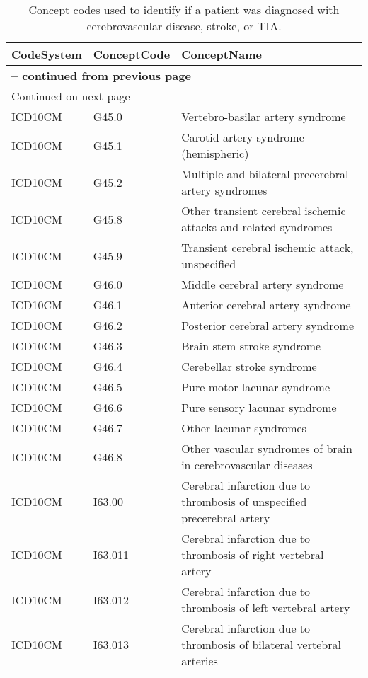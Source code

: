 \begin{longtable}{p{}p{}p{}}
\caption{Concept codes used to identify if a patient was diagnosed with cerebrovascular disease, stroke, or TIA.} \\ 
 CodeSystem & ConceptCode & ConceptName \\ 
  \hline 
\endfirsthead 
\multicolumn{3}{p{\textwidth}}{{ \bfseries \tablename \thetable{} -- continued from previous page}} \ 
\hline CodeSystem & ConceptCode & ConceptName \\ \hline 
\endhead 
\hline \multicolumn{3}{p{\textwidth}}{{Continued on next page}} \\ \hline 
\endfoot 
\hline 
\endlastfoot 
 \hline
ICD10CM & G45.0 & Vertebro-basilar artery syndrome \\ 
  ICD10CM & G45.1 & Carotid artery syndrome (hemispheric) \\ 
  ICD10CM & G45.2 & Multiple and bilateral precerebral artery syndromes \\ 
  ICD10CM & G45.8 & Other transient cerebral ischemic attacks and related syndromes \\ 
  ICD10CM & G45.9 & Transient cerebral ischemic attack, unspecified \\ 
  ICD10CM & G46.0 & Middle cerebral artery syndrome \\ 
  ICD10CM & G46.1 & Anterior cerebral artery syndrome \\ 
  ICD10CM & G46.2 & Posterior cerebral artery syndrome \\ 
  ICD10CM & G46.3 & Brain stem stroke syndrome \\ 
  ICD10CM & G46.4 & Cerebellar stroke syndrome \\ 
  ICD10CM & G46.5 & Pure motor lacunar syndrome \\ 
  ICD10CM & G46.6 & Pure sensory lacunar syndrome \\ 
  ICD10CM & G46.7 & Other lacunar syndromes \\ 
  ICD10CM & G46.8 & Other vascular syndromes of brain in cerebrovascular diseases \\ 
  ICD10CM & I63.00 & Cerebral infarction due to thrombosis of unspecified precerebral artery \\ 
  ICD10CM & I63.011 & Cerebral infarction due to thrombosis of right vertebral artery \\ 
  ICD10CM & I63.012 & Cerebral infarction due to thrombosis of left vertebral artery \\ 
  ICD10CM & I63.013 & Cerebral infarction due to thrombosis of bilateral vertebral arteries \\ 

\end{longtable}
